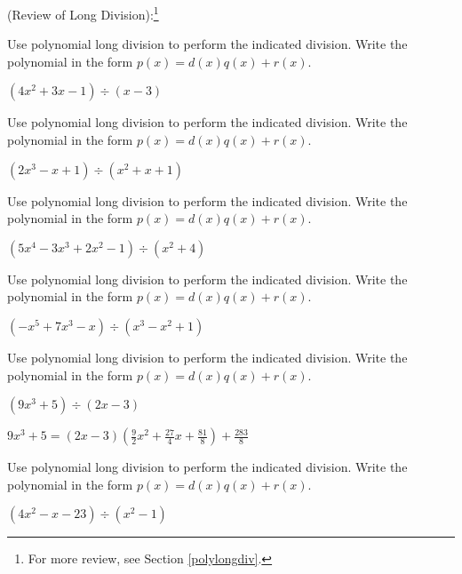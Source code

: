 \documentclass{ximera}
\begin{document}
	\author{Stitz-Zeager}


(Review of Long Division):\footnote{For more review, see Section \ref{polylongdiv}.}  

\begin{problem}\label{longpolydivreviewfirst}
Use polynomial long division to perform the indicated division.  Write the polynomial in the form $p(x) = d(x)q(x) + r(x)$.

$\left(4x^2+3x-1 \right) \div (x-3)$ 
\end{problem}

\begin{problem}
Use polynomial long division to perform the indicated division.  Write the polynomial in the form $p(x) = d(x)q(x) + r(x)$.

$\left(2x^3-x+1 \right) \div \left(x^{2} +x+1 \right)$ 
\end{problem}

\begin{problem}
Use polynomial long division to perform the indicated division.  Write the polynomial in the form $p(x) = d(x)q(x) + r(x)$.

$\left(5x^{4} - 3x^{3} + 2x^{2} - 1 \right) \div \left(x^{2} + 4 \right)$ 
\end{problem}

\begin{problem}
Use polynomial long division to perform the indicated division.  Write the polynomial in the form $p(x) = d(x)q(x) + r(x)$.

$\left(-x^{5} + 7x^{3} - x \right) \div \left(x^{3} - x^{2} + 1 \right)$ 
\end{problem} 

\begin{problem}
Use polynomial long division to perform the indicated division.  Write the polynomial in the form $p(x) = d(x)q(x) + r(x)$.

$\left(9x^{3} + 5 \right) \div \left(2x - 3 \right)$

\begin{solution}
$9x^{3} + 5 =(2x - 3) \left(\frac{9}{2}x^{2} + \frac{27}{4}x + \frac{81}{8} \right) + \frac{283}{8}$
\end{solution}
\end{problem} 

\begin{problem}\label{longpolydivreviewlast}
Use polynomial long division to perform the indicated division.  Write the polynomial in the form $p(x) = d(x)q(x) + r(x)$.

$\left(4x^2 - x - 23 \right) \div \left(x^{2} - 1 \right)$ 
\end{problem}  
\end{document}
